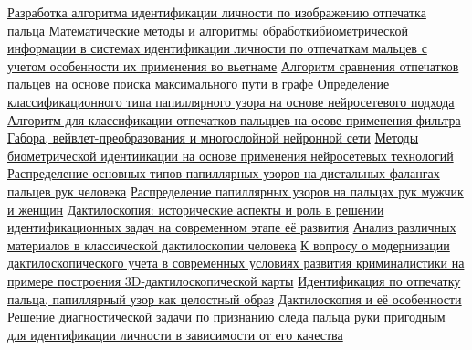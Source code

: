 \documentclass{article}
\begin{document}
\begin{thebibliography}{9}
     \bibitem{} \href{https://elibrary.ru/download/elibrary_17421420_21592996.pdf}{Разработка алгоритма идентификации личности по изображению отпечатка пальца}
     \bibitem{}  \href{https://elibrary.ru/download/elibrary_25727935_97678811.pdf}{Математические методы и алгоритмы обработкибиометрической информации в системах идентификации личности по отпечаткам мальцев с учетом особенности их применения во вьетнаме}
     \bibitem{}  \href{https://www.mathnet.ru/php/archive.phtml?wshow=paper&jrnid=ista&paperid=128&option_lang=rus}{Алгоритм сравнения отпечатков пальцев на основе поиска максимального пути в графе}
     \bibitem{}  \href{https://cj.bgu.ru/reader/article.aspx?id=27104}{Определение классификационного типа папиллярного узора на основе нейросетевого подхода}
     \bibitem{}  \href{https://cyberleninka.ru/article/n/algoritmy-dlya-klassifikatsii-otpechatkov-paltsev-na-osnove-primeneniya-filtra-gabora-veyvletspreobrazovaniya-i-mnogosloynoy}{Алгоритм для классификации отпечатков пальццев на осове применения фильтра Габора, вейвлет-преобразования и многослойной нейронной сети}
     \bibitem{}  \href{https://elibrary.ru/download/elibrary_42663680_16253640.pdf}{Методы биометрической идентиикации на основе применения нейросетевых технологий}
     \bibitem{}  \href{https://www.mediasphera.ru/issues/sudebno-meditsinskaya-ekspertiza/2019/1/1003945212019011017}{Распределение основных типов папиллярных узоров на дистальных фалангах пальцев рук человека}
     \bibitem{}  \href{https://elib.gsmu.by/handle/GomSMU/9062}{Распределение папиллярных узоров на пальцах рук мужчик и женщин}
     \bibitem{}  \href{https://elibrary.ru/download/elibrary_38557701_42204720.pdf}{Дактилоскопия: исторические аспекты и роль в решении идентификационных задач на современном этапе её развития}
     \bibitem{}  \href{https://elibrary.ru/download/elibrary_50506717_45015847.pdf}{Анализ различных материалов в классической дактилоскопии человека}
     \bibitem{}  \href{https://elibrary.ru/download/elibrary_39657698_78801553.pdf}{К вопросу о модернизации дактилоскопического учета в современных условиях развития криминалистики на примере построения 3D-дактилоскопической карты}
     \bibitem{} \href{https://elibrary.ru/download/elibrary_54061151_92328469.pdf#page=87}{Идентификация по отпечатку пальца, папиллярный узор как целостный образ}
     \bibitem{}  \href{https://elibrary.ru/download/elibrary_41857591_46698129.pdf}{Дактилоскопия и её особенности}
     \bibitem{} \href{https://elib.institutemvd.by/jspui/bitstream/MVD_NAM/8521/1/Yumatov%20S.%20V..pdf}{Решение диагностической задачи по признанию следа пальца руки пригодным для идентификации личности в зависимости от его качества}

\end{thebibliography}
\end{document}
